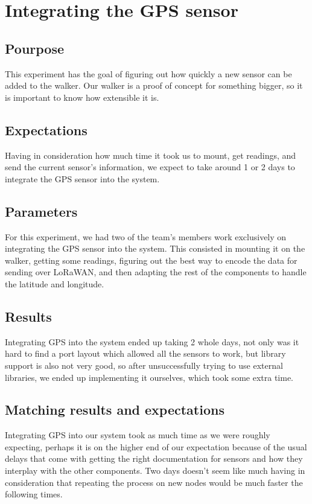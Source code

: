 \section{Integrating the GPS sensor}
	\subsection{Pourpose}
	This experiment has the goal of figuring out how quickly a new sensor can be added to the walker. Our walker is a proof of concept for something bigger, so it is important to know how extensible it is.

	\subsection{Expectations}
	Having in consideration how much time it took us to mount, get readings, and send the current sensor's information, we expect to take around 1 or 2 days to integrate the GPS sensor into the system. 

	\subsection{Parameters}
	For this experiment, we had two of the team's members work exclusively on integrating the GPS sensor into the system. This consisted in mounting it on the walker, getting some readings, figuring out the best way to encode the data for sending over LoRaWAN, and then adapting the rest of the components to handle the latitude and longitude.

	\subsection{Results}
	Integrating GPS into the system ended up taking 2 whole days, not only was it hard to find a port layout which allowed all the sensors to work, but library support is also not very good, so after unsuccessfully trying to use external libraries, we ended up implementing it ourselves, which took some extra time.

	\subsection{Matching results and expectations}
	Integrating GPS into our system took as much time as we were roughly expecting, perhaps it is on the higher end of our expectation because of the usual delays that come with getting the right documentation for sensors and how they interplay with the other components. Two days doesn't seem like much having in consideration that repeating the process on new nodes would be much faster the following times.

